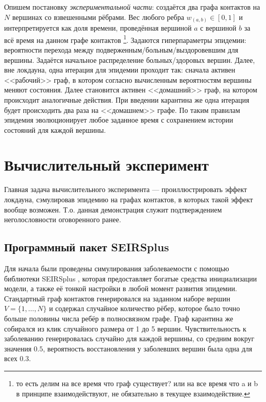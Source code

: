	Опишем постановку \textit{экспериментальной части}: создаётся два графа контактов на $ N $ вершинах со взвешенными рёбрами. Вес любого ребра $ w_{(a, b)} \in [0, 1] $ и интерпретируется как доля времени, проведённая вершиной $ a $ с вершиной $ b $ за всё время на данном графе контактов \footnote{то есть делим на все время что граф существует? или на все время что a и b в принципе взаимодействуют, не обязательно в текущее взаимодействие.}. Задаются гиперпараметры эпидемии: вероятности перехода между подверженным/больным/выздоровевшим для вершины. Задаётся начальное распределение больных/здоровых вершин. Далее, вне локдауна, одна итерация для эпидемии проходит так: сначала активен <<рабочий>> граф, в котором согласно вычисленным вероятностям вершины меняют состояния. Далее становится активен <<домашний>> граф, на котором происходит аналогичные действия. При введении карантина же одна итерация будет происходить два раза на <<домашнем>> графе. По таким правилам эпидемия эволюционирует любое заданное время с сохранением истории состояний для каждой вершины.
	
	\section*{Вычислительный эксперимент}
	
	Главная задача вычислительного эксперимента --- проиллюстрировать эффект локдауна, сэмулировав эпидемию на графах контактов, в которых такой эффект вообще возможен. Т.о. данная демонстрация служит подтверждением неголословности оговоренного ранее.
	
	\subsection*{Программный пакет SEIRSplus}
	
	Для начала были проведены симулирования заболеваемости с помощью библиотеки SEIRSplus \cite{seirsplus}, которая предоставляет богатые средства инициализации модели, а также её тонкой настройки в любой момент развития эпидемии. Стандартный граф контактов генерировался на заданном наборе вершин $ V = \{1, \ldots, N\} $ и содержал случайное количество рёбер, которое было точно больше половины числа ребёр в полносвязном графе. Граф карантина же собирался из клик случайного размера от 1 до 5 вершин. Чувствительность к заболеванию генерировалась случайно для каждой вершины, со средним вокруг значения $ 0.5 $, вероятность восстановления у заболевших вершин была одна для всех $ 0.3 $. 
	
